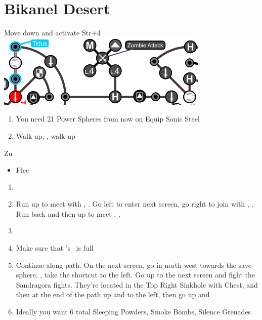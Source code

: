 \chapter{Bikanel Desert}
\begin{spheregrid}
  \begin{itemize}
    \tidusf Move down and activate Str+4
    \includegraphics[width=.8\columnwidth]{graphics/tidus_bikanel}
  \end{itemize}
\end{spheregrid}
\begin{enumerate}
  \item You need 21 Power Spheres from now on
        \tidusf Equip Sonic Steel
  \item Walk up, \sd, walk up
\end{enumerate}
\begin{battle}{Zu}
  \begin{itemize}
    \tidusf Defend
    \tidusf Attack
    \tidusf Defend until all party members arrive
    \item Flee
  \end{itemize}
\end{battle}
\begin{enumerate}[resume]
  \item \sd
  \item Run up to meet with \wakka, \sd. Go left to enter next screen, go right to join with \kimahri, \sd. Run back and then up to meet \rikku, \sd, \save
  \item \formation{\tidus}{\kimahri}{\auron}
  \item Make sure that \rikku's \od\ is full
  \item Continue along path. On the next screen, go in north-west towards the save sphere, \save, take the shortcut to the left. Go up to the next screen and fight the Sandragora fights. They're located in the Top Right Sinkhole with Chest, and then at the end of the path up and to the left, then go up and \sd
  \item Ideally you want 6 total Sleeping Powders, Smoke Bombs, Silence Grenades
\end{enumerate}
